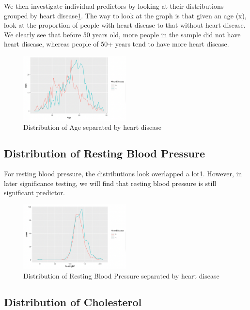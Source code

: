 \documentclass{article}
\begin{document}
We then investigate individual predictors by looking at their distributions grouped by heart disease\ref{fig2}. The way to look at the graph is that given an age (x), look at the proportion of people with heart disease to that without heart disease. We clearly see that before 50 years old, more people in the sample did not have heart disease, whereas people of 50+ years tend to have more heart disease. 


\begin{figure}[h]
	\centering
	\includegraphics[width=0.5\textwidth]{images/dist1.PNG}
	\caption{Distribution of Age separated by heart disease}
	\label{fig2}
\end{figure}

\subsection {Distribution of Resting Blood Pressure}

For resting blood pressure, the distributions look overlapped a lot\ref{fig2}. However, in later significance testing, we will find that resting blood pressure is still significant predictor. 

\begin{figure}[h]
	\centering
	\includegraphics[width=0.5\textwidth]{images/dist2.PNG}
	\caption{Distribution of Resting Blood Pressure separated by heart disease}
	\label{fig3}
\end{figure}

\subsection {Distribution of Cholesterol}
\end{document}
